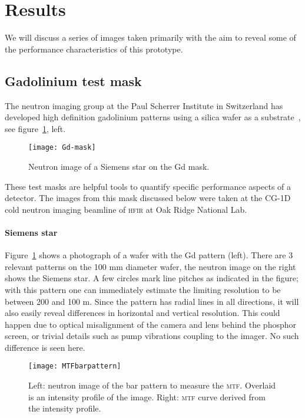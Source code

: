 \documentclass[a4paper,11pt]{article}
\begin{document}
\section{Results}
We will discuss a series of images taken primarily with the aim to reveal some of the performance characteristics of this prototype.

\subsection{Gadolinium test mask}
The neutron imaging group at the Paul Scherrer Institute in Switzerland has developed high definition gadolinium patterns using a silica wafer as a substrate~\cite{Gd-mask}, see figure~\ref{Gd-mask}, left.
\begin{figure}[b]
	\centering\texttt{[image: Gd-mask]}
	\caption{Neutron image of a Siemens star on the Gd mask.\label{Gd-mask}}
\end{figure}
These test masks are helpful tools to quantify specific performance aspects of a detector.
The images from this mask discussed below were taken at the CG-1D cold neutron imaging beamline of \textsc{hfir} at Oak Ridge National Lab.

\paragraph{Siemens star}
Figure~\ref{Gd-mask} shows a photograph of a wafer with the Gd pattern (left).
There are 3 relevant patterns on the 100 mm diameter wafer, the neutron image on the right shows the Siemens star.
A few circles mark line pitches as indicated in the figure; with this pattern one can immediately estimate the limiting resolution to be between 200 and 100 \textmu m.
Since the pattern has radial lines in all directions, it will also easily reveal differences in horizontal and vertical resolution.
This could happen due to optical misalignment of the camera and lens behind the phosphor screen, or trivial details such as pump vibrations coupling to the imager.
No such difference is seen here.

\begin{figure}[tb]
	\centering\texttt{[image: MTFbarpattern]}
	\caption{Left: neutron image of the bar pattern to measure the \textsc{mtf}. Overlaid is an intensity profile of the image. Right: \textsc{mtf} curve derived from the intensity profile. \label{BarPattern}}
\end{figure}
\end{document}
